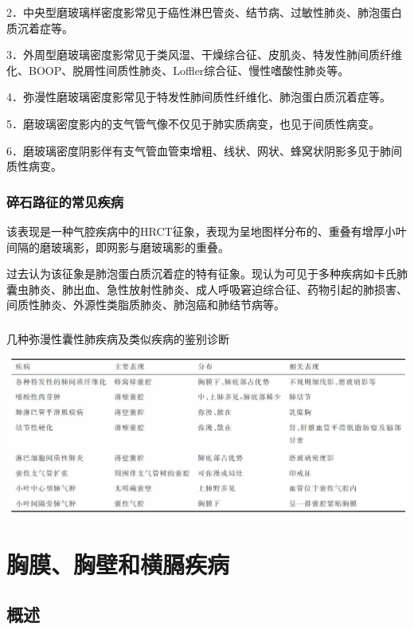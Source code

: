 2．中央型磨玻璃样密度影常见于癌性淋巴管炎、结节病、过敏性肺炎、肺泡蛋白质沉着症等。　

3．外周型磨玻璃密度影常见于类风湿、干燥综合征、皮肌炎、特发性肺间质纤维化、BOOP、脱屑性间质性肺炎、Loffler综合征、慢性嗜酸性肺炎等。

4．弥漫性磨玻璃密度影常见于特发性肺间质性纤维化、肺泡蛋白质沉着症等。

5．磨玻璃密度影内的支气管气像不仅见于肺实质病变，也见于间质性病变。

6．磨玻璃密度阴影伴有支气管血管束增粗、线状、网状、蜂窝状阴影多见于肺间质性病变。

\subsubsection{碎石路征的常见疾病}

该表现是一种气腔疾病中的HRCT征象，表现为呈地图样分布的、重叠有增厚小叶间隔的磨玻璃影，即网影与磨玻璃影的重叠。

过去认为该征象是肺泡蛋白质沉着症的特有征象。现认为可见于多种疾病如卡氏肺囊虫肺炎、肺出血、急性放射性肺炎、成人呼吸窘迫综合征、药物引起的肺损害、间质性肺炎、外源性类脂质肺炎、肺泡癌和肺结节病等。

\subsubsection{}

\begin{table}[htbp]
\centering
\caption{几种弥漫性囊性肺疾病及类似疾病的鉴别诊断}
\label{tab9-13}
\includegraphics[width=\textwidth,height=\textheight,keepaspectratio]{./images/Image00240.jpg}
\end{table}

\section{胸膜、胸壁和横膈疾病}

\subsection{概述}


